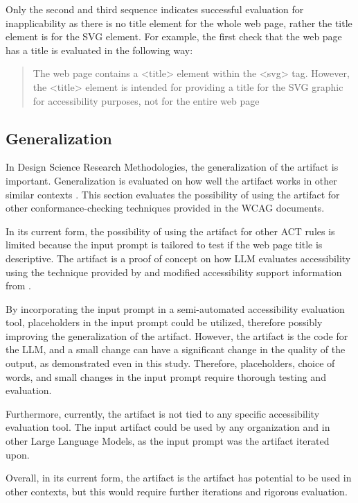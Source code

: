 Only the second and third sequence indicates successful evaluation for inapplicability as there is no title element for the whole web page, rather the title element is for the SVG element. For example, the first check that the web page has a title is evaluated in the following way: \blockquote{The web page contains a <title> element within the <svg> tag. However, the <title> element is intended for providing a title for the SVG graphic for accessibility purposes, not for the entire web page}.


\subsection{Generalization}

In Design Science Research Methodologies, the generalization of the artifact is important. Generalization is evaluated on how well the artifact works in other similar contexts \citep{design_science_eval}. This section evaluates the possibility of using the artifact for other conformance-checking techniques provided in the WCAG documents.

In its current form, the possibility of using the artifact for other ACT rules is limited because the input prompt is tailored to test if the web page title is descriptive. The artifact is a proof of concept on how LLM evaluates accessibility using the technique provided by \textcite{g88} and modified accessibility support information from \textcite{act_rule_g88}. 

By incorporating the input prompt in a semi-automated accessibility evaluation tool, placeholders in the input prompt could be utilized, therefore possibly improving the generalization of the artifact. However, the artifact is the code for the LLM, and a small change can have a significant change in the quality of the output, as demonstrated even in this study. Therefore, placeholders, choice of words, and small changes in the input prompt require thorough testing and evaluation.

Furthermore, currently, the artifact is not tied to any specific accessibility evaluation tool. The input artifact could be used by any organization and in other Large Language Models, as the input prompt was the artifact iterated upon.

Overall, in its current form, the artifact is the artifact has potential to be used in other contexts, but this would require further iterations and rigorous evaluation.
